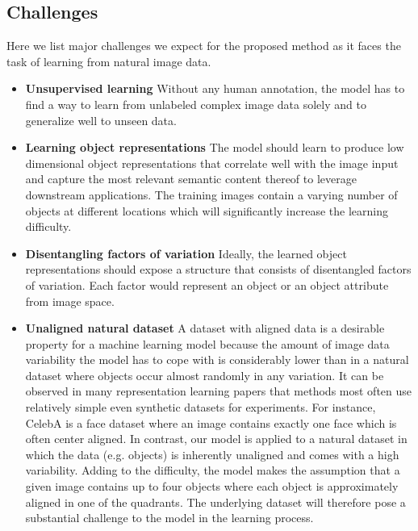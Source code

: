 \documentclass[12pt,a4paper]{article}
\begin{document}
\subsection{Challenges}
Here we list major challenges we expect for the proposed method as it faces the task of learning from natural image data.
\begin{itemize}
  \item \textbf{Unsupervised learning} Without any human annotation, the model has to find a way to learn from unlabeled complex image data solely and to generalize well to unseen data.
  \item \textbf{Learning object representations} The model should learn to produce low dimensional object representations that correlate well with the image input and capture the most relevant semantic content thereof to leverage downstream applications. The training images contain a varying number of objects at different locations which will significantly increase the learning difficulty.
  \item \textbf{Disentangling factors of variation} Ideally, the learned object representations should expose a structure that consists of disentangled factors of variation. Each factor would represent an object or an object attribute from image space.
  \item \textbf{Unaligned natural dataset} A dataset with aligned data is a desirable property for a machine learning model because the amount of image data variability the model has to cope with is considerably lower than in a natural dataset where objects occur almost randomly in any variation. It can be observed in many representation learning papers that methods most often use relatively simple even synthetic datasets for experiments. For instance, CelebA is a face dataset where an image contains exactly one face which is often center aligned. In contrast, our model is applied to a natural dataset in which the data (e.g. objects) is inherently unaligned and comes with a high variability. Adding to the difficulty, the model makes the assumption that a given image contains up to four objects where each object is approximately aligned in one of the quadrants. The underlying dataset will therefore pose a substantial challenge to the model in the learning process.
\end{itemize}


\newpage
\end{document}
